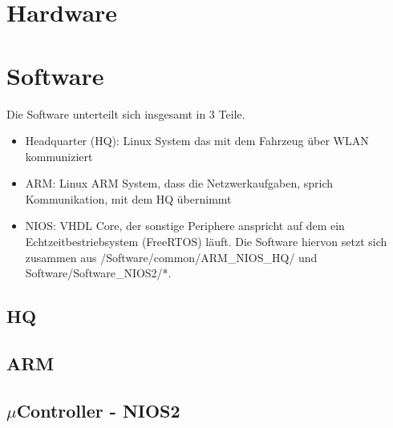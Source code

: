 \chapter{Hardware}

\chapter{Software}
Die Software unterteilt sich insgesamt in 3 Teile.
\begin{itemize}
 \item Headquarter (HQ): Linux System das mit dem Fahrzeug über WLAN kommuniziert
 \item ARM: Linux ARM System, dass die Netzwerkaufgaben, sprich Kommunikation, mit dem HQ übernimmt
 \item NIOS: VHDL Core, der sonstige Periphere anspricht auf dem ein Echtzeitbestriebsystem (FreeRTOS) läuft. Die Software hiervon setzt sich zusammen aus /Software/common/ARM\_NIOS\_HQ/ und Software/Software\_NIOS2/*.
\end{itemize}

\section{HQ}


\section{ARM}



\section{$\mu$Controller - NIOS2}



